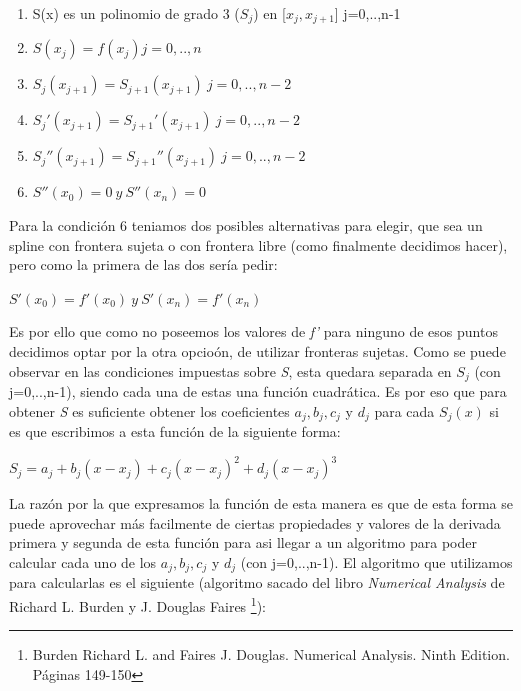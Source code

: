 \documentclass[10pt, a4paper]{article}
\begin{document}
\begin{enumerate}
\item S(x) es un polinomio de grado 3 ($S_{j}$) en [$x_{j}, x_{j+1}$] j=0,..,n-1
\item $S(x_{j})=f(x_{j}) j=0,..,n$
\item $S_{j}(x_{j+1}) = S_{j+1}(x_{j+1}) \ j=0,..,n-2$
\item $S_{j}'(x_{j+1}) = S_{j+1}'(x_{j+1}) \ j=0,..,n-2$
\item $S_{j}''(x_{j+1}) = S_{j+1}''(x_{j+1}) \ j=0,..,n-2$
\item $S''(x_{0}) = 0 \ y \ S''(x_{n}) = 0$
\end{enumerate}

Para la condici\'on 6 teniamos dos posibles alternativas para elegir, que sea un spline con frontera sujeta o con frontera libre (como finalmente decidimos hacer), pero como la primera de las dos ser\'ia pedir:

\begin{centering}
$S'(x_{0}) = f'(x_{0}) \ y \ S'(x_{n}) = f'(x_{n})$
\end{centering}

Es por ello que como no poseemos los valores de \textit{f'} para ninguno de esos puntos decidimos optar por la otra opcio\'on, de utilizar fronteras sujetas.
Como se puede observar en las condiciones impuestas sobre \textit{S}, esta quedara separada en \textit{$S_{j}$} (con j=0,..,n-1), siendo cada una de estas una funci\'on cuadr\'atica. Es por eso que para obtener \textit{S} es suficiente obtener los coeficientes $a_{j}, b_{j}, c_{j}$ y $d_{j}$ para cada $S_{j}(x)$ si es que escribimos a esta funci\'on de la siguiente forma:

\begin{centering}
$S_{j} = a_{j}+b_{j}(x-x_{j})+c_{j}(x-x_{j})^2+d_{j}(x-x_{j})^3$
\end{centering}

La raz\'on por la que expresamos la funci\'on de esta manera es que de esta forma se puede aprovechar m\'as facilmente de ciertas propiedades y valores de la derivada primera y segunda de esta funci\'on para asi llegar a un algoritmo para poder calcular cada uno de los $a_{j}, b_{j}, c_{j}$ y $d_{j}$ (con j=0,..,n-1). El algoritmo que utilizamos para calcularlas es el siguiente (algoritmo sacado del libro \textit{Numerical Analysis} de Richard L. Burden y J. Douglas Faires \footnote{Burden Richard L. and Faires J. Douglas. Numerical Analysis. Ninth Edition. P\'aginas 149-150}):
\end{document}
